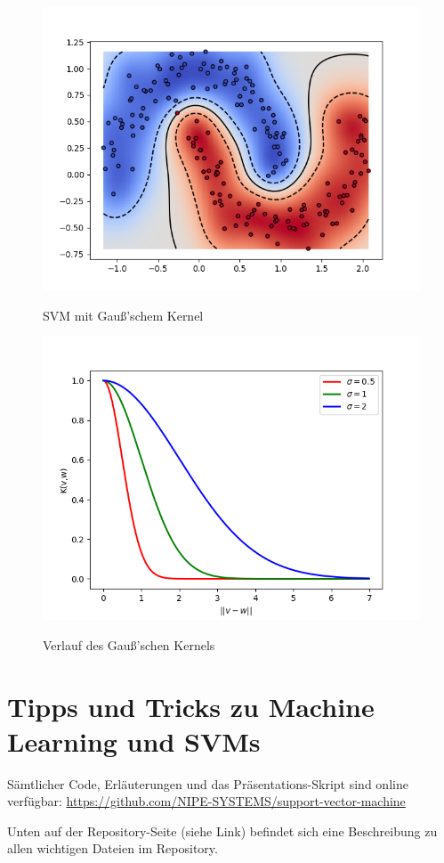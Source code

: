 \documentclass[10pt,a4paper]{scrartcl}
\begin{document}
\begin{figure}[ht]
\begin{minipage}[b]{0.5\linewidth}
                        \centering
                        \includegraphics[width=.8\textwidth]{img_kernel/kernelGau.png}
                        \caption{SVM mit Gauß'schem Kernel} 
                        \vspace{4ex}
                        \label{ker:gau}
                    \end{minipage}%
                    \begin{minipage}[b]{0.5\linewidth}
                        \centering
                        \includegraphics[width=.8\textwidth]{img_kernel/sigmaGau.png}
                        \caption{Verlauf des Gauß'schen Kernels}
                        \vspace{4ex}
                        \label{ker:sig}
                    \end{minipage} 
                \end{figure}

        \section{Tipps und Tricks zu Machine Learning und SVMs}
            Sämtlicher Code, Erläuterungen und das Präsentations-Skript sind online verfügbar: \url{https://github.com/NIPE-SYSTEMS/support-vector-machine}
            
            Unten auf der Repository-Seite (siehe Link) befindet sich eine Beschreibung zu allen wichtigen Dateien im Repository.


\end{document}
